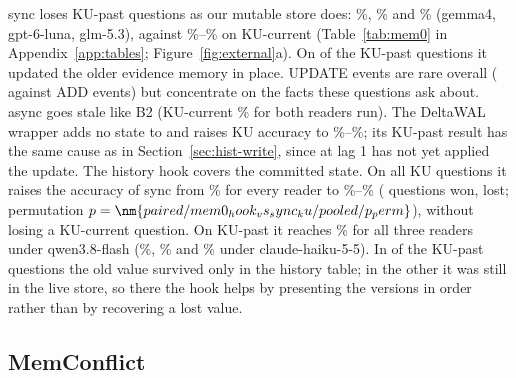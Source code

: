 \memzero{} sync loses KU-past questions as our mutable store does: \%, \% and \% (gemma4, gpt-6-luna, glm-5.3), against \%--\% on KU-current (Table~\ref{tab:mem0} in Appendix~\ref{app:tables}; Figure~\ref{fig:external}a). On  of the  KU-past questions it updated the older evidence memory in place. UPDATE events are rare overall ( against  ADD events) but concentrate on the facts these questions ask about. \memzero{} async goes stale like B2 (KU-current \% for both readers run). The DeltaWAL wrapper adds no state to \memzero{} and raises KU accuracy to \%--\%; its KU-past result has the same cause as in Section~\ref{sec:hist-write}, since at lag 1 \memzero{} has not yet applied the update. The history hook covers the committed state. On all  KU questions it raises the accuracy of \memzero{} sync from \% for every reader to \%--\% ( questions won,  lost; permutation $p=\nm{paired/mem0_hook_vs_sync_ku/pooled/p_perm}$), without losing a KU-current question. On KU-past it reaches \% for all three readers under qwen3.8-flash (\%, \% and \% under claude-haiku-5-5). In  of the  KU-past questions the old value survived only in the history table; in the other  it was still in the live store, so there the hook helps by presenting the versions in order rather than by recovering a lost value.

\subsection{MemConflict}
\label{sec:memconflict}

